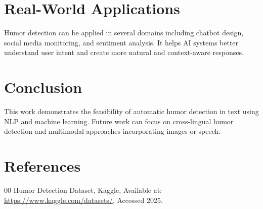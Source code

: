 \documentclass[conference]{IEEEtran}
\begin{document}
\section{Real-World Applications}
Humor detection can be applied in several domains including chatbot design, social media monitoring, and sentiment analysis. It helps AI systems better understand user intent and create more natural and context-aware responses.

\section{Conclusion}
This work demonstrates the feasibility of automatic humor detection in text using NLP and machine learning. Future work can focus on cross-lingual humor detection and multimodal approaches incorporating images or speech.

\section*{References}
\begin{thebibliography}{00}
 Humor Detection Dataset, Kaggle, Available at: \url{https://www.kaggle.com/datasets/}, Accessed 2025.
\end{thebibliography}
\end{document}
